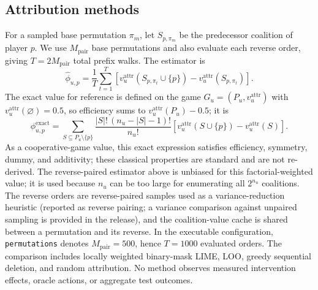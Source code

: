\documentclass[manuscript,screen,review,anonymous]{acmart}
\begin{document}
\subsection{Attribution methods}
For a sampled base permutation $\pi_m$, let $S_{p,\pi_m}$ be the predecessor coalition of player $p$. We use $M_{\mathrm{pair}}$ base permutations and also evaluate each reverse order, giving $T=2M_{\mathrm{pair}}$ total prefix walks. The estimator is
\begin{equation}
\widehat\phi_{u,p}=\frac{1}{T}\sum_{t=1}^{T}\left[v_u^{\mathrm{attr}}(S_{p,\pi_t}\cup\{p\})-v_u^{\mathrm{attr}}(S_{p,\pi_t})\right].
\end{equation}
The exact value for reference is defined on the game $G_u=(P_u,v_u^{\mathrm{attr}})$ with $v_u^{\mathrm{attr}}(\varnothing)=0.5$, so efficiency sums to $v_u^{\mathrm{attr}}(P_u)-0.5$; it is
\begin{equation}
\phi^{\mathrm{exact}}_{u,p}=
\sum_{S\subseteq P_u\setminus\{p\}}
\frac{|S|!\,(n_u-|S|-1)!}{n_u!}
\left[v_u^{\mathrm{attr}}(S\cup\{p\})-v_u^{\mathrm{attr}}(S)\right].
\label{eq:exact-shapley}
\end{equation}
As a cooperative-game value, this exact expression satisfies efficiency, symmetry, dummy, and additivity; these classical properties are standard and are not re-derived. The reverse-paired estimator above is unbiased for this factorial-weighted value; it is used because $n_u$ can be too large for enumerating all $2^{n_u}$ coalitions. The reverse orders are reverse-paired samples used as a variance-reduction heuristic (reported as reverse pairing; a variance comparison against unpaired sampling is provided in the release), and the coalition-value cache is shared between a permutation and its reverse. In the executable configuration, \texttt{permutations} denotes $M_{\mathrm{pair}}=500$, hence $T=1000$ evaluated orders. The comparison includes locally weighted binary-mask LIME, LOO, greedy sequential deletion, and random attribution. No method observes measured intervention effects, oracle actions, or aggregate test outcomes.
\end{document}
